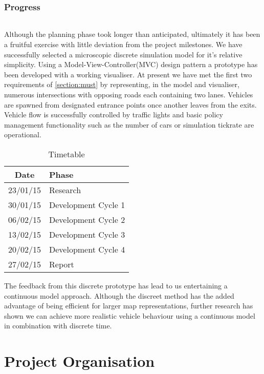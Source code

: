 \documentclass[11pt,a4paper]{article}
\begin{document}
\section{Progress}
\paragraph{}
Although the planning phase took longer than anticipated, ultimately it has been a fruitful exercise with little deviation from the project milestones.  We have successfully selected a microscopic discrete simulation model for it's relative simplicity.  Using a Model-View-Controller(MVC) design pattern a prototype has been developed with a working visualiser.  At present we have met the first two requirements of \ref{section:must} by representing, in the model and visualiser, numerous intersections with opposing roads each containing two lanes.  Vehicles are spawned from designated entrance points once another leaves from the exits.  Vehicle flow is successfully controlled by traffic lights and basic policy management functionality such as the number of cars or simulation tickrate are operational.
 
\begin{wraptable}{r}{6cm}
	\begin{tabular}{|c|l|}
	\hline
	Date & Phase \\ \hline
	23/01/15 & Research \\ \hline
	30/01/15 & Development Cycle 1 \\ \hline
	06/02/15 & Development Cycle 2 \\ \hline
	13/02/15 & Development Cycle 3 \\ \hline
	20/02/15 & Development Cycle 4 \\ \hline
	27/02/15 & Report \\
	\hline
	\end{tabular}
	\caption{Timetable}
\end{wraptable}

The feedback from this discrete prototype has lead to us entertaining a continuous model approach.  Although the discreet method has the added advantage of being efficient for larger map representations, further research has shown we can achieve more realistic vehicle behaviour using a continuous model in combination with discrete time.


\part{Project Organisation}
\end{document}
